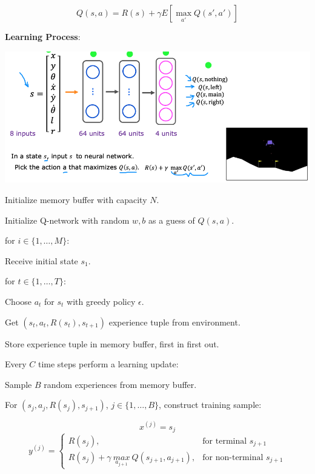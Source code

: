 \documentclass{article}
\begin{document}
\[Q(s, a) = R(s) + \gamma E[\max_{a'} Q(s', a')]\]

\noindent \textbf{Learning Process}:

\begin{center}
\includegraphics[scale=0.3]{./images/q_learning_nn.png}
\end{center}

\noindent Initialize memory buffer with capacity \(N\).

\noindent Initialize Q-network with random \(w, b\) as a guess of \(Q(s, a)\).

\noindent for \(i \in \{1, \dots, M\}\):

\noindent \hspace{.5cm} Receive initial state \(s_1\).

\noindent \hspace{.5cm} for \(t \in \{1, \dots, T\}\):

\noindent \hspace{1cm} Choose \(a_{t}\) for \(s_{t}\) with greedy policy \(\epsilon\).

\noindent \hspace{1cm} Get \((s_{t}, a_{t}, R(s_{t}), s_{t+1})\) experience tuple from environment.

\noindent \hspace{1cm} Store experience tuple in memory buffer, first in first out.

\bigskip

\noindent \hspace{1cm} Every \(C\) time steps perform a learning update:

\noindent \hspace{1cm} Sample \(B\) random experiences from memory buffer.

\noindent \hspace{1cm} For \((s_{j}, a_{j}, R(s_{j}), s_{j+1})\), \(j \in \{1, \dots, B\}\), construct training sample:

\[x^{(j)} = s_{j}\]
\[
y^{(j)} =
\begin{cases}
  R(s_{j}), & \text{for terminal } s_{j+1} \\
  R(s_{j}) + \gamma \ \underset{a_{j+1}}{max} \ Q(s_{j+1}, a_{j+1}), & \text{for non-terminal } s_{j+1}
\end{cases}
\]
\end{document}

